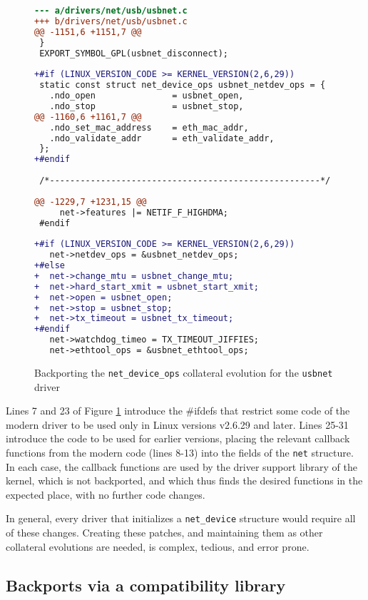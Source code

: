 \begin{figure}
\begin{lstlisting}[language=diff]
--- a/drivers/net/usb/usbnet.c
+++ b/drivers/net/usb/usbnet.c
@@ -1151,6 +1151,7 @@
 }
 EXPORT_SYMBOL_GPL(usbnet_disconnect);
 
+#if (LINUX_VERSION_CODE >= KERNEL_VERSION(2,6,29))
 static const struct net_device_ops usbnet_netdev_ops = {
   .ndo_open               = usbnet_open,
   .ndo_stop               = usbnet_stop,
@@ -1160,6 +1161,7 @@
   .ndo_set_mac_address    = eth_mac_addr,
   .ndo_validate_addr      = eth_validate_addr,
 };
+#endif
 
 /*-----------------------------------------------------*/
 
@@ -1229,7 +1231,15 @@
     net->features |= NETIF_F_HIGHDMA;
 #endif
 
+#if (LINUX_VERSION_CODE >= KERNEL_VERSION(2,6,29))
   net->netdev_ops = &usbnet_netdev_ops;
+#else
+  net->change_mtu = usbnet_change_mtu;
+  net->hard_start_xmit = usbnet_start_xmit;
+  net->open = usbnet_open;
+  net->stop = usbnet_stop;
+  net->tx_timeout = usbnet_tx_timeout;
+#endif
   net->watchdog_timeo = TX_TIMEOUT_JIFFIES;
   net->ethtool_ops = &usbnet_ethtool_ops;
\end{lstlisting}
\caption{Backporting the {\tt net\_\-device\_\-ops} collateral evolution for
  the {\tt usbnet} driver}
\label{usbport}
\end{figure}

Lines 7 and 23 of Figure \ref{usbport} introduce the \#ifdefs that restrict
some code of the modern driver to be used only in Linux versions v2.6.29
and later.  Lines 25-31 introduce the code to be used for earlier versions,
placing the relevant callback functions from the modern code (lines 8-13)
into the fields of the {\tt net} structure.  In each case, the callback
functions are used by the driver support library of the kernel, which is
not backported, and which thus finds the desired functions in the expected
place, with no further code changes.

In general, every driver that initializes a {\tt net\_\-device} structure
would require all of these changes.  Creating these patches, and
maintaining them as other collateral evolutions are needed, is complex,
tedious, and error prone.

\subsection{Backports via a compatibility library}

